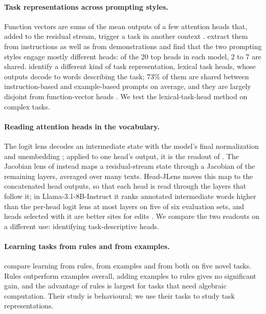 \documentclass[11pt,a4paper]{article}
\begin{document}
\paragraph{Task representations across prompting styles.} Function vectors are sums of the mean outputs of a few attention heads that, added to the residual stream, trigger a task in another context \citep{todd2024function}. \citet{davidson2025different} extract them from instructions as well as from demonstrations and find that the two prompting styles engage mostly different heads: of the 20 top heads in each model, 2 to 7 are shared. \citet{yang2026shared} identify a different kind of task representation, lexical task heads, whose outputs decode to words describing the task; 73\% of them are shared between instruction-based and example-based prompts on average, and they are largely disjoint from function-vector heads \citep[App.~I]{yang2026shared}. We test the lexical-task-head method on complex tasks.

\paragraph{Reading attention heads in the vocabulary.} The logit lens decodes an intermediate state with the model's final normalization and unembedding \citep{nostalgebraist2020logitlens}; applied to one head's output, it is the readout of \citet{yang2026shared}. The Jacobian lens of \citet{gurnee2026workspace} instead maps a residual-stream state through a Jacobian of the remaining layers, averaged over many texts. Head-JLens moves this map to the concatenated head outputs, so that each head is read through the layers that follow it; in Llama-3.1-8B-Instruct it ranks annotated intermediate words higher than the per-head logit lens at most layers on five of six evaluation sets, and heads selected with it are better sites for edits \citep{merlo2026headjlens}. We compare the two readouts on a different use: identifying task-descriptive heads.

\paragraph{Learning tasks from rules and from examples.} \citet{fu2026rules} compare learning from rules, from examples and from both on five novel tasks. Rules outperform examples overall, adding examples to rules gives no significant gain, and the advantage of rules is largest for tasks that need algebraic computation. Their study is behavioural; we use their tasks to study task representations.
\end{document}
